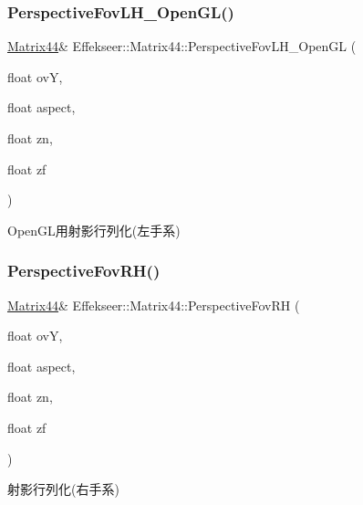 \subsubsection{\texorpdfstring{Perspective\+Fov\+L\+H\+\_\+\+Open\+G\+L()}{PerspectiveFovLH\_OpenGL()}}
{\footnotesize\ttfamily \mbox{\hyperlink{struct_effekseer_1_1_matrix44}{Matrix44}}\& Effekseer\+::\+Matrix44\+::\+Perspective\+Fov\+L\+H\+\_\+\+Open\+GL (\begin{DoxyParamCaption}\item[{float}]{ovY,  }\item[{float}]{aspect,  }\item[{float}]{zn,  }\item[{float}]{zf }\end{DoxyParamCaption})}



Open\+G\+L用射影行列化(左手系) 

\mbox{\label{struct_effekseer_1_1_matrix44_a0deeef1c9ef11e08b34d72d8cc1907a1}} 
\subsubsection{\texorpdfstring{Perspective\+Fov\+R\+H()}{PerspectiveFovRH()}}
{\footnotesize\ttfamily \mbox{\hyperlink{struct_effekseer_1_1_matrix44}{Matrix44}}\& Effekseer\+::\+Matrix44\+::\+Perspective\+Fov\+RH (\begin{DoxyParamCaption}\item[{float}]{ovY,  }\item[{float}]{aspect,  }\item[{float}]{zn,  }\item[{float}]{zf }\end{DoxyParamCaption})}



射影行列化(右手系) 

\mbox{\label{struct_effekseer_1_1_matrix44_a7d8f52cbf92efe51564a2314a212df78}} 
